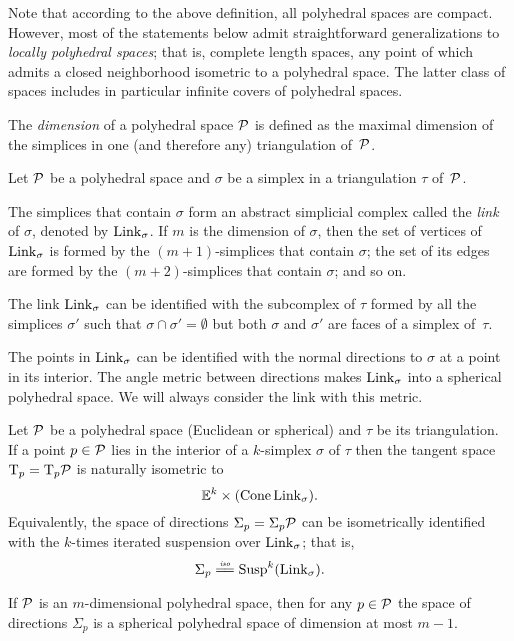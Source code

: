 Note that according to the above definition,
all polyhedral spaces are compact.
However, 
most of the statements below admit straightforward generalizations 
to \emph{locally polyhedral spaces};
that is, complete length spaces,  
any point of which admits a closed neighborhood isometric to a polyhedral space.
The latter class of spaces includes in particular infinite covers of polyhedral spaces.

The \emph{dimension} of a polyhedral space $\mathcal{P}$
is defined as the maximal dimension of the simplices 
in one (and therefore any) triangulation of~$\mathcal{P}$.

Let $\mathcal{P}$ be a polyhedral space
and $\sigma$ be a simplex in a triangulation $\tau$ of~$\mathcal{P}$.

The simplices that  contain $\sigma$
form an abstract simplicial complex called the \emph{link} of $\sigma$, 
denoted by $\mathop{\rm Link}\nolimits_\sigma$.
If $m$ is  the dimension of $\sigma$,
then the set of vertices of $\mathop{\rm Link}\nolimits_\sigma$
is formed by the $(m+1)$-simplices that  contain $\sigma$;
the set of its edges are formed by the $(m+2)$-simplices 
that contain $\sigma$; and so on.

The link $\mathop{\rm Link}\nolimits_\sigma$
can be identified with the subcomplex of $\tau$ 
formed by all the simplices $\sigma'$ 
such that $\sigma\cap\sigma'=\emptyset$ 
but both $\sigma$ and $\sigma'$ are faces of a simplex of~$\tau$.

The points in $\mathop{\rm Link}\nolimits_\sigma$ can be identified with the normal directions to $\sigma$ at a point in its interior.
The angle metric between directions makes  $\mathop{\rm Link}\nolimits_\sigma$ into a spherical polyhedral space.
We will always consider the link with this metric.

Let $\mathcal{P}$ be a polyhedral space (Euclidean or spherical) and  $\tau$ be its triangulation.
If a point $p\in \mathcal{P}$ 
lies in the interior of a $k$-simplex $\sigma$ of $\tau$ 
then the tangent space $\mathrm{T}_p=\mathrm{T}_p\mathcal{P}$
is  naturally isometric to
\[\mathbb{E}^k\times(\mathop{\rm Cone}\nolimits\mathop{\rm Link}\nolimits_\sigma).\]
Equivalently, the space of directions $\Sigma_p=\Sigma_p\mathcal{P}$
can be isometrically identified with the 
$k$-times iterated suspension over $\mathop{\rm Link}\nolimits_\sigma$;
that is, 
\[\Sigma_p\iso\Susp^{k}(\Link_\sigma).\]

If $\mathcal{P}$ is an $m$-dimensional polyhedral space,
then for any $p\in \mathcal{P}$
the space of directions $\Sigma_p$ is a spherical polyhedral space
of dimension at most $m-1$. 


